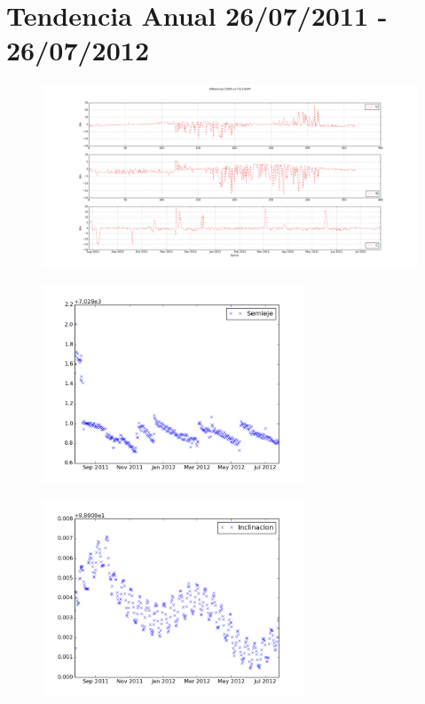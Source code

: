 \section*{Tendencia Anual 26/07/2011 - 26/07/2012}
\begin{figure}[!h]
\centering
  \includegraphics[width=\textwidth]{imagenes/sacDtendenciaAnualVNC}
\end{figure}
\begin{figure}[!h]
\centering
  \includegraphics[width=0.7\textwidth]{imagenes/sacDtendSemi}
\end{figure}
\begin{figure}[!h]
\centering
  \includegraphics[width=0.7\textwidth]{imagenes/sacDtendInc}
\end{figure}


